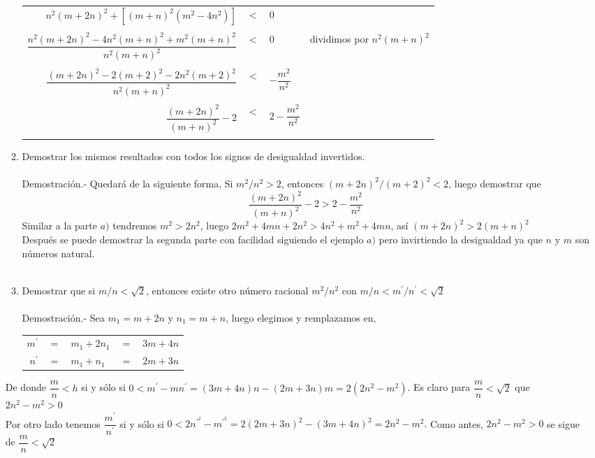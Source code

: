 \begin{enumerate}[\bfseries 1.]
\begin{enumerate}[\bfseries (a)]
\begin{center}
\begin{tabular}{r c l l}
      $n^2(m+2n)^2  +  \left[ (m+n)^2 (m^2 - 4n^2) \right]$&$<$&$0$&\\\\
      $\dfrac{n^2(m+2n)^2 - 4n^2(m+n)^2 + m^2(m+n)^2}{n^2(m+n)^2}$&$<$&$0$&dividimos por $n^2(m+n)^2$\\\\
      $\dfrac{(m+2n)^2 - 2(m+2)^2 - 2n^2(m+2)^2}{n^2(m+n)^2}$&$<$&$- \dfrac{m^2}{n^2}$&\\\\
      $\dfrac{(m+2n)^2}{(m+n)^2} - 2$&$<$&$2 - \dfrac{m^2}{n^2}$&\\\\
      \end{tabular}
      \end{center}

      \item Demostrar los mismos resultados con todos los signos de desigualdad invertidos. \\\\
      Demostración.- \; Quedará de la siguiente forma, Si $m^2/n^2>2$, entonces $\left( m+2n \right)^2 / \left( m + 2 \right)^2 < 2$, luego demostrar que $$\dfrac{\left( m + 2n \right)^2}{\left( m + n \right)^2} - 2 > 2 - \dfrac{m^2}{n^2}$$
      Similar a la parte $a)$ tendremos $m^2 > 2n^2$, luego $2m^2 + 4mn + 2n^2 > 4n^2 + m^2 + 4mn$, así $ (m+2n)^2 > 2(m + n)^2 $\\
      Después se puede demostrar la segunda parte con facilidad siguiendo el ejemplo $a)$ pero invirtiendo la desigualdad ya que $n$ \; y \; $m$ son números natural.\\\\

      \item Demostrar que si $m/n < \sqrt{2}$, entonces existe otro número racional $m^2 / n^2$ con $m/n < m^{'} / n^{'} < \sqrt{2}$\\\\
      Demostración.- \; Sea $m_1=m+2n$ y $n_1=m+n$, luego elegimos y remplazamos en,  
      \begin{center}
      \begin{tabular}{rclcr}
      $m^{'}$ & $=$ & $m_1+2n_1$ & $=$ & $3m+4n$\\
      $n^{'}$ & $=$ & $m_1+n_1$  & $=$ & $2m+3n$\\
      \end{tabular}
      \end{center}
      \end{enumerate}
      De donde $\dfrac{m}{n}<h$ si y sólo si $0<m^{'} - mn^{'}=(3m+4n)n - (2m + 3n)m=2(2n^2 - m^2)$. Es claro para $\dfrac{m}{n} < \sqrt{2}$ que $2n^2 - m^2 >0$\\
      Por otro lado tenemos $\dfrac{m^{'}}{n^{'}}$ si y sólo si $0<2n^{'^{2}} - m^{'^{2}}=2(2m+3n)^2-(3m+4n)^2=2n^2 - m^2.$ Como antes, $2n^2-m^2>0$ se sigue de $\dfrac{m}{n}<\sqrt{2}$\\\\
 

\end{enumerate}
